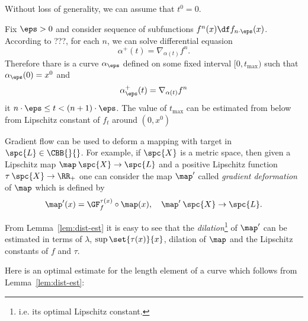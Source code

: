 \newcommand*{\Lob}{\hbox{
\vcenter{\offinterlineskip
\hbox{\CYRL}%
\vskip-1.597ex\hskip-1.9ex\hbox{\color{white}$\mathbf{I}$}%
\vskip-1.597ex\hskip-1.9ex\hbox{$\II$}%
\vskip-.311ex\hskip-2.842ex\hbox{\tiny\color{white}.}}}}















Without loss of generality, we can assume that $t^0=0$.

Fix $\eps>0$ 
and consider sequence of subfunctions
$f^n(x)\df f_{n\cdot\eps}(x)$.
According to ???, for each $n$, we can solve differential equasion
$$\alpha^+(t)=\nabla_{\alpha(t)}f^n.$$
Therefore thare is a curve $\alpha_\eps$ defined on some fixed interval $[0,t_{\max})$
such that $\alpha_\eps(0)=x^0$ and
$$\alpha_\eps^+(t)= \nabla_{\alpha(t)}f^n$$
it $n\cdot\eps\le t<(n+1)\cdot\eps$.
The value of $t_{\max}$ can be estimated from below from Lipschitz constant of $f_t$ around $(0,x^0)$

\qeds















Gradient flow can be used to deform a mapping with target in $\spc{L}\in\CBB{}{}$. 
For example, if $\spc{X}$ is a metric space, then given a Lipschitz map $\map\:\spc{X}\to \spc{L}$ and
a positive Lipschitz function $\tau\:\spc{X}\to \RR_+$ one can consider the map $\map'$ called
\emph{gradient deformation} of $\map$ which is defined by
$$\map'(x)=\GF_f^{\tau(x)}\circ \map(x),\ \ \ \map'\:\spc{X}\to \spc{L}.$$

From Lemma~\ref{lem:dist-est} it is easy to see that the \emph{dilation}\footnote{i.e. its optimal Lipschitz constant.}
of $\map'$
can be estimated in terms of $\lambda$, $\sup\set{\tau(x)}{x}$, dilation of $\map$ and the
Lipschitz constants of $f$ and $\tau$.

Here is an optimal estimate for the length element of a curve which follows from
Lemma~\ref{lem:dist-est}:

